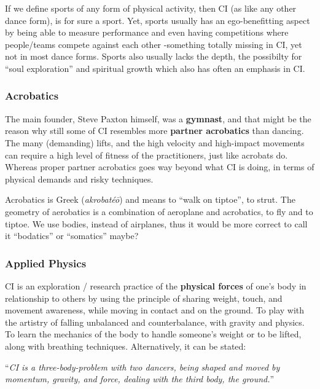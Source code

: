 If we define sports of any form of physical activity, then CI (as like any other dance form), is for sure a sport.
Yet, sports usually has an ego-benefitting aspect by being able to measure performance and even having competitions where people/teams compete against each other -something totally missing in CI, yet not in most dance forms.
Sports also usually lacks the depth, the possibilty for ``soul exploration'' and spiritual growth which also has often an emphasis in CI.

\subsubsection{Acrobatics}\label{subsec:acrobatics}

The main founder, Steve Paxton himself, was a \textbf{gymnast}, and that might be the reason why still some of CI resembles more \textbf{partner acrobatics} than dancing.
The many (demanding) lifts, and the high velocity and high-impact movements can require a high level of fitness of the practitioners, just like acrobats do.
Whereas proper partner acrobatics goes way beyond what CI is doing, in terms of physical demands and risky techniques.

Acrobatics is Greek (\textit{akrobatéō}) and means to ``walk on tiptoe'', to strut.
The geometry of aerobatics is a combination of aeroplane and acrobatics, to fly and to tiptoe.
We use bodies, instead of airplanes, thus it would be more correct to call it ``bodatics'' or ``somatics'' maybe?

\subsubsection{Applied Physics}\label{subsec:applied-physics}

CI is an exploration / research practice of the \textbf{physical forces} of one's body in relationship to others by using the principle of sharing weight, touch, and movement awareness, while moving in contact and on the ground.
To play with the artistry of falling unbalanced and counterbalance, with gravity and physics.
To learn the mechanics of the body to handle someone's weight or to be lifted, along with breathing techniques.
Alternatively, it can be stated:

\begin{center}
    ``\textit{CI is a three-body-problem with two dancers, being shaped and moved by momentum, gravity, and force, dealing with the third body, the ground.}''
\end{center}

